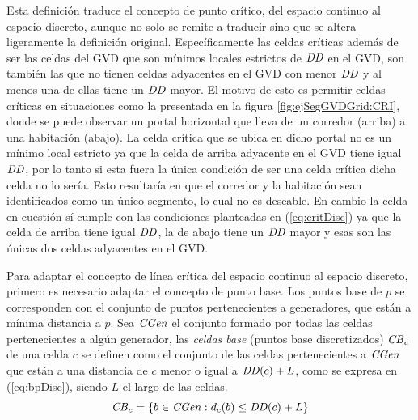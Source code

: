
Esta definición traduce el concepto de punto crítico, del espacio continuo al
espacio discreto, aunque no solo se remite a traducir sino que se altera
ligeramente la definición original. Específicamente las celdas críticas además de ser las
celdas del GVD que son mínimos locales estrictos de $\mathit{DD}$ en el GVD, son
también las que no tienen celdas adyacentes en el GVD con menor $\mathit{DD}$ y al
menos una de ellas tiene un $\mathit{DD}$ mayor.
El motivo de esto es permitir celdas críticas en situaciones como la
presentada en la figura \ref{fig:ejSegGVDGrid:CRI}, donde se puede observar un
portal horizontal que lleva de un corredor (arriba) a una habitación (abajo).
La celda crítica que se ubica en dicho portal no es un mínimo local estricto ya que la
celda de arriba adyacente en el GVD tiene igual $\mathit{DD}$, por lo tanto si esta fuera la
única condición de ser una celda crítica dicha celda no lo sería. Esto resultaría en
que el corredor y la habitación sean identificados como un único segmento, lo cual no es deseable.
En cambio la celda en cuestión sí cumple con las condiciones planteadas en
(\ref{eq:critDisc}) ya que la celda de arriba tiene igual $\mathit{DD}$, la de
abajo tiene un $\mathit{DD}$ mayor y esas son las únicas dos celdas adyacentes en
el GVD. 



Para adaptar el concepto de línea crítica del espacio continuo al espacio
discreto, primero es necesario adaptar el concepto de punto base. Los puntos
base de $p$ se corresponden con el conjunto de puntos pertenecientes a generadores,
que están a mínima distancia a $p$. Sea $\mathit{CGen}$ el conjunto formado por
todas las celdas pertenecientes a algún generador, las \emph{celdas base}
(puntos base discretizados) $\mathit{CB}_c$ de una celda $c$ se definen como el
conjunto de las celdas pertenecientes a $\mathit{CGen}$ que están a una distancia de $c$
menor o igual a $\mathit{DD}(c)+L$, como se expresa en (\ref{eq:bpDisc}), siendo
$L$ el largo de las celdas.
\begin{equation}
\mathit{CB}_c = \{ b \in \mathit{CGen} : d_c(b) \leq \mathit{DD}(c) + L\}
\label{eq:bpDisc}
\end{equation}


